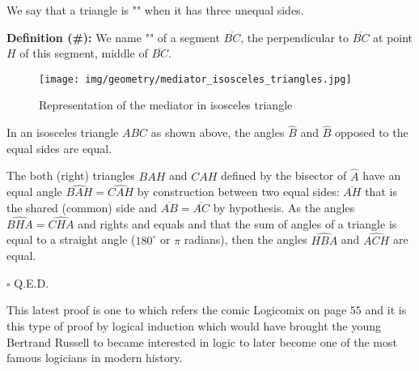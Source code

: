 	\begin{tcolorbox}[title=Remark,colframe=black,arc=10pt]
	We say that a triangle is "" when it has three unequal sides.
	\end{tcolorbox}
	\textbf{Definition (\#\mydef):} We name "\label{mediator}" of a segment $\overline{BC}$, the perpendicular to $\overline{BC}$ at point $H$ of this segment, middle of $\overline{BC}$.
	\begin{figure}[H]
		\centering
		\texttt{[image: img/geometry/mediator\_isosceles\_triangles.jpg]}
		\caption{Representation of the mediator in isosceles triangle}
	\end{figure}
	\begin{theorem}
	In an isosceles triangle $ABC$ as shown above, the angles $\hat{B}$ and $\hat{B}$ opposed to the equal sides are equal.
	\end{theorem}
	
	\begin{dem}
	The both (right) triangles $BAH$ and $CAH$ defined by the bisector of  $\widehat{A}$ have an equal angle $\widehat{BAH}=\widehat{CAH}$ by construction between two equal sides: $\overline{AH}$ that is the shared (common) side and $\overline{AB} = \overline{AC}$ by hypothesis. As the angles $\widehat{BHA}=\widehat{CHA}$ and rights and equals and that the sum of angles of a triangle is equal to a straight angle ($180^\circ$ or $\pi$ radians), then the angles $\widehat{HBA}$ and $\widehat{ACH}$ are equal.
	\begin{flushright}
		$\square$  Q.E.D.
	\end{flushright}
	\end{dem}
	\begin{tcolorbox}[title=Remark,colframe=black,arc=10pt]
	This latest proof is one to which refers the comic Logicomix on page $55$ and it is this type of proof by logical induction which would have brought the young Bertrand Russell to became interested in logic to later become one of the most famous logicians in modern history.
	\end{tcolorbox}
	
